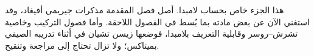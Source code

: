 \documentclass[../../include/open-logic-part]{subfiles}
\begin{document}

\begin{editorial}
هذا الجزء خاص بحساب لامبدا. أصل فصل المقدمة مذكرات جيريمي أفيغاد،
وقد استغني الآن عن بعض مادته بما بُسط في الفصول اللاحقة.
وأما فصول التركيب وخاصية تشرش--روسر وقابلية التعريف بلامبدا،
فوضعها زيسن تشيان في أثناء تدريبه الصيفي بميتاكس؛
ولا تزال تحتاج إلى مراجعة وتنقيح.
\end{editorial}





\OLEndPartHook
\end{document}
